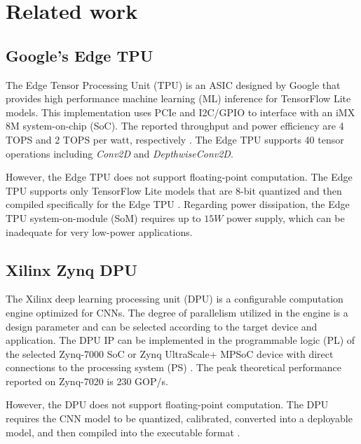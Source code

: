 \section{Related work}
\label{sec:related_work}
\subsection{Google's Edge TPU}

The Edge Tensor Processing Unit (TPU) is an ASIC designed by Google that provides high performance machine learning (ML) inference for TensorFlow Lite models\cite{yazdanbakhsh2021evaluation}. This implementation uses PCIe and I2C/GPIO to interface with an iMX 8M system-on-chip (SoC). The reported throughput and power efficiency are 4 TOPS and 2 TOPS per watt, respectively \cite{coral2021Datasheet}. The Edge TPU supports 40 tensor operations including \emph{Conv2D} and \emph{DepthwiseConv2D}.

However, the Edge TPU  does not support floating-point computation. The Edge TPU supports only TensorFlow Lite models that are 8-bit quantized and then compiled specifically for the Edge TPU \cite{cass2019taking}. Regarding power dissipation, the Edge TPU system-on-module (SoM) requires up to $15W$ power supply\cite{coral2021Datasheet}, which can be inadequate for very low-power applications.

\subsection{Xilinx Zynq DPU}
The Xilinx deep learning processing unit (DPU) is a configurable computation engine optimized for CNNs. The degree of parallelism utilized in the engine is a design parameter and can be selected according to the target device and application. The DPU IP can be implemented in the programmable logic (PL) of the selected Zynq-7000 SoC or Zynq UltraScale+ MPSoC device with direct connections to the processing system (PS) \cite{xilinxDPU}. The peak theoretical performance reported on Zynq-7020 is 230 GOP/s.

However, the DPU does not support floating-point computation. The DPU requires the CNN model to be quantized, calibrated, converted into a deployable model, and then compiled into the executable format \cite{xilinxDPU}.